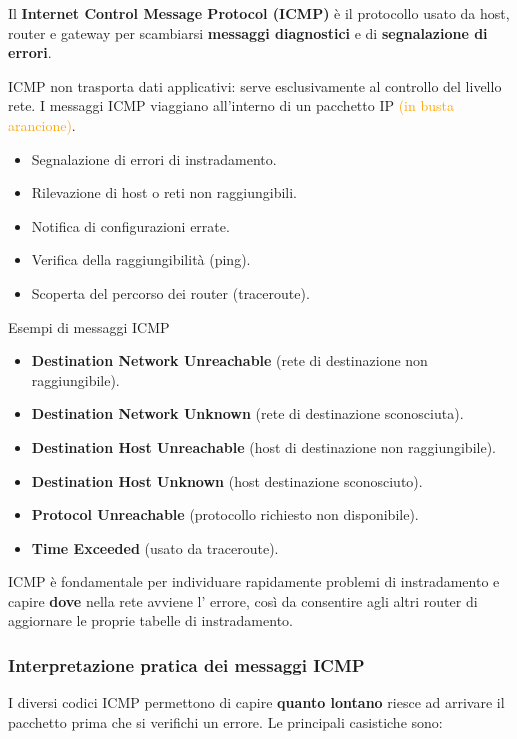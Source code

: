 \documentclass[a4paper,12pt]{report}
\begin{document}
Il \textbf{Internet Control Message Protocol (ICMP)} è il protocollo usato da host, router e gateway
per scambiarsi \textbf{messaggi diagnostici} e di \textbf{segnalazione di errori}.  

ICMP non trasporta dati applicativi: serve esclusivamente al controllo del livello rete.
I messaggi ICMP viaggiano all’interno di un pacchetto IP \textcolor{orange}{(in busta arancione)}.

\begin{itemize}
    \item Segnalazione di errori di instradamento.
    \item Rilevazione di host o reti non raggiungibili.
    \item Notifica di configurazioni errate.
    \item Verifica della raggiungibilità (ping).
    \item Scoperta del percorso dei router (traceroute).
\end{itemize}


\begin{notebox}{Esempi di messaggi ICMP}
\begin{itemize}
    \item \textbf{Destination Network Unreachable} (rete di destinazione non raggiungibile).
    \item \textbf{Destination Network Unknown} (rete di destinazione sconosciuta).
    \item \textbf{Destination Host Unreachable} (host di destinazione non raggiungibile).
    \item \textbf{Destination Host Unknown} (host destinazione sconosciuto).
    \item \textbf{Protocol Unreachable} (protocollo richiesto non disponibile).
    \item \textbf{Time Exceeded} (usato da traceroute).
\end{itemize}
\end{notebox}

ICMP è fondamentale per individuare rapidamente problemi di instradamento e capire
\textbf{dove} nella rete avviene l' errore, così da consentire agli altri router di aggiornare le proprie tabelle di instradamento.

\newpage
\subsubsection{Interpretazione pratica dei messaggi ICMP}

I diversi codici ICMP permettono di capire \textbf{quanto lontano} riesce ad arrivare il pacchetto
prima che si verifichi un errore. Le principali casistiche sono:
\end{document}
